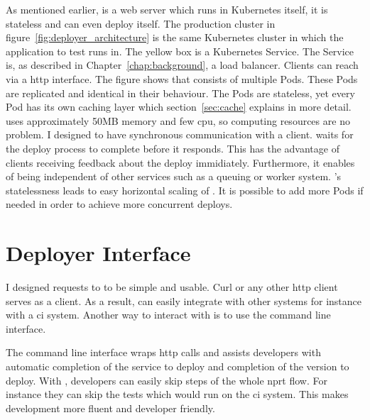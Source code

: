 As mentioned earlier, \deployer{} is a web server which runs in Kubernetes itself, it is
stateless and can even deploy itself. The production cluster in
figure~\ref{fig:deployer_architecture} is the same Kubernetes cluster in which the
application to test runs in. The yellow box is a Kubernetes Service. The Service is, as
described in Chapter~\ref{chap:background}, a load balancer. Clients can reach \deployer{}
via a \gls{http} interface. The figure shows that \deployer{} consists of multiple Pods. These
Pods are replicated and identical in their behaviour. The Pods are
stateless, yet every Pod has its own caching layer which section~\ref{sec:cache} explains
in more detail. \deployer{} uses approximately 50MB memory and few \gls{cpu}, so computing
resources are no problem. I designed \deployer{} to have synchronous communication with a
client. \deployer{} waits for the deploy process to complete before it responds. This has
the advantage of clients receiving feedback about the deploy immidiately. Furthermore, it enables
\deployer{} of being independent of other services such as a queuing or worker
system. \deployer{}'s statelessness leads to easy horizontal scaling of \deployer{}. It is
possible to add more Pods if needed in order to achieve more concurrent deploys.

\section{Deployer Interface}
\label{sec:interface}

I designed requests to \deployer{} to be simple and usable. Curl or any other \gls{http} client
serves as a client. As a result, \deployer{} can easily integrate with other systems for
instance with a \gls{ci} system. Another way to interact with \deployer{} is to use the
\depctl{} command line interface.

The \depctl{} command line interface wraps \gls{http} calls and assists developers with automatic
completion of the service to deploy and completion of the version to deploy. With \depctl{},
developers can easily skip steps of the whole \gls{nprt} flow. For instance they can skip
the tests which would run on the \gls{ci} system. This makes development more fluent and
developer friendly.

